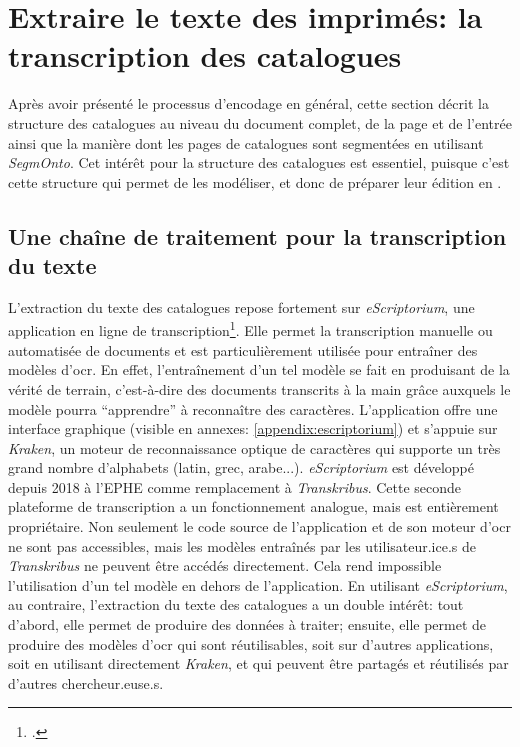 \section{Extraire le texte des imprimés: la transcription des catalogues}
Après avoir présenté le processus d'encodage en général, cette section décrit la structure des catalogues au niveau du document complet, de la page et de l'entrée ainsi que la manière dont les pages de catalogues sont segmentées en utilisant \textit{SegmOnto}. Cet intérêt pour la structure des catalogues est essentiel, puisque c'est cette structure qui permet de les modéliser, et donc de préparer leur édition en \xmltei{}.

\subsection{Une chaîne de traitement pour la transcription du texte}
L'extraction du texte des catalogues repose fortement sur \textit{eScriptorium}, une application en ligne de transcription\footcite{stokes_escriptorium_2021}. Elle permet la transcription manuelle ou automatisée de documents et est particulièrement utilisée pour entraîner des modèles d'\gls{ocr}. En effet, l'entraînement d'un tel modèle se fait en produisant de la vérité de terrain, c'est-à-dire des documents transcrits à la main grâce auxquels le modèle pourra \enquote{apprendre} à reconnaître des caractères. L'application offre une interface graphique (visible en annexes: \ref{appendix:escriptorium}) et s'appuie sur \textit{Kraken}, un moteur de reconnaissance optique de caractères qui supporte un très grand nombre d'alphabets (latin, grec, arabe...). \textit{eScriptorium} est développé depuis 2018 à l'EPHE comme remplacement à \textit{Transkribus}. Cette seconde plateforme de transcription a un fonctionnement analogue, mais est entièrement propriétaire. Non seulement le code source de l'application et de son moteur d'\gls{ocr} ne sont pas accessibles, mais les modèles entraînés par les utilisateur.ice.s de \textit{Transkribus} ne peuvent être accédés directement. Cela rend impossible l'utilisation d'un tel modèle en dehors de l'application. En utilisant \textit{eScriptorium}, au contraire, l'extraction du texte des catalogues a un double intérêt: tout d'abord, elle permet de produire des données à traiter; ensuite, elle permet de produire des modèles d'\gls{ocr} qui sont réutilisables, soit sur d'autres applications, soit en utilisant directement \textit{Kraken}, et qui peuvent être partagés et réutilisés par d'autres chercheur.euse.s.

